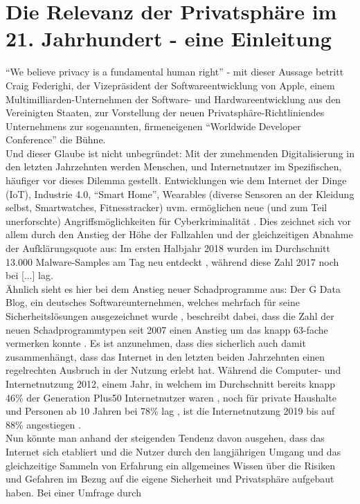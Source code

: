 \chapter{Die Relevanz der Privatsphäre im 21. Jahrhundert - eine Einleitung} %
\label{Introduction} %

\enquote{We believe privacy is a fundamental human right} \cite{Apple:2020aa} - mit dieser Aussage betritt Craig Federighi, der Vizepräsident der Softwareentwicklung von Apple, einem Multimilliarden-Unternehmen der Software- und Hardwareentwicklung aus den Vereinigten Staaten, zur Vorstellung der 
neuen Privatsphäre-Richtliniendes Unternehmens zur sogenannten, firmeneigenen \enquote{Worldwide Developer Conference} die Bühne. \\ Und dieser Glaube ist nicht unbegründet: Mit der zunehmenden Digitalisierung in den letzten Jahrzehnten werden Menschen, und Internetnutzer im Spezifischen, 
häufiger vor dieses Dilemma gestellt. Entwicklungen wie dem Internet der Dinge (IoT), Industrie 4.0, \enquote{Smart Home}, Wearables (diverse Sensoren an der Kleidung selbst, Smartwatches, Fitnesstracker) uvm. ermöglichen neue (und zum Teil unerforschte) Angriffsmöglichkeiten für Cyberkriminalität \cite{Bundeskriminalamt:2018aa}.
Dies zeichnet sich vor allem durch den Anstieg der Höhe der Fallzahlen und der gleichzeitigen Abnahme der Aufklärungsquote aus: Im ersten Halbjahr 2018 wurden im Durchschnitt 13.000 Malware-Samples am Tag neu entdeckt \cite{GDB:18}, während diese Zahl 2017 noch bei [...] lag. \\ Ähnlich sieht es hier bei
dem Anstieg neuer Schadprogramme aus: Der G Data Blog, ein deutsches Softwareunternehmen, welches mehrfach für seine Sicherheitslösungen ausgezeichnet wurde \cite{GD:2020aa}, beschreibt dabei, dass die Zahl der neuen Schadprogrammtypen seit 2007 einen Anstieg um das knapp 63-fache vermerken konnte \cite{GDB:17}. 
Es ist anzunehmen, dass dies sicherlich auch damit zusammenhängt, dass das Internet in den letzten beiden Jahrzehnten einen regelrechten Ausbruch in der Nutzung erlebt hat. Während die Computer- und Internetnutzung 2012, einem Jahr, in welchem im Durchschnitt bereits knapp 46\% der Generation Plus50 Internetnutzer waren
\cite{GfK:2016aa}, noch für private Haushalte und Personen ab 10 Jahren bei 78\% lag \cite{Bundesamt:2019aa}, ist die Internetnutzung 2019 bis auf 88\% angestiegen \cite{Bundesamt:2019aa}. \\
Nun könnte man anhand der steigenden Tendenz davon ausgehen, dass das Internet sich etabliert und die Nutzer durch den langjährigen Umgang und das gleichzeitige Sammeln von Erfahrung ein allgemeines Wissen über die Risiken und Gefahren im Bezug auf die eigene Sicherheit und Privatsphäre aufgebaut haben. Bei einer Umfrage durch 

